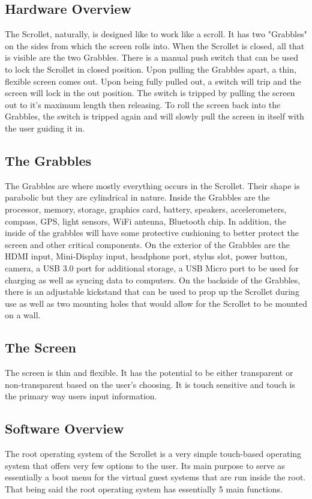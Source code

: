 \documentclass[a4paper]{article}
\begin{document}
\subsection{Hardware Overview}
The Scrollet, naturally, is designed like to work like a scroll. It has two "Grabbles" on the sides from which the screen rolls into. When the Scrollet is closed, all that is visible are the two Grabbles. There is a manual push switch that can be used to lock the Scrollet in closed position. Upon pulling the Grabbles apart, a thin, flexible screen comes out. Upon being fully pulled out, a switch will trip and the screen will lock in the out position. The switch is tripped by pulling the screen out to it's maximum length then releasing. To roll the screen back into the Grabbles, the switch is tripped again and will slowly pull the screen in itself with the user guiding it in.

\subsection{The Grabbles}
The Grabbles are where mostly everything occurs in the Scrollet. Their shape is parabolic but they are cylindrical in nature. Inside the Grabbles are the processor, memory, storage, graphics card, battery, speakers, accelerometers, compass, GPS, light sensors, WiFi antenna, Bluetooth chip. In addition, the inside of the grabbles will have some protective cushioning to better protect the screen and other critical components. On the exterior of the Grabbles are the HDMI input, Mini-Display input, headphone port, stylus slot, power button, camera, a USB 3.0 port for additional storage, a USB Micro port to be used for charging as well as syncing data to computers. On the backside of the Grabbles, there is an adjustable kickstand that can be used to prop up the Scrollet during use as well as two mounting holes that would allow for the Scrollet to be mounted on a wall.

\subsection{The Screen}
The screen is thin and flexible. It has the potential to be either transparent or non-transparent based on the user's choosing. It is touch sensitive and touch is the primary way users input information.

\subsection{Software Overview}
The root operating system of the Scrollet is a very simple touch-based operating system that offers very few options to the user. Its main purpose to serve as essentially a boot menu for the virtual guest systems that are run inside the root. That being said the root operating system has essentially 5 main functions.
\end{document}
